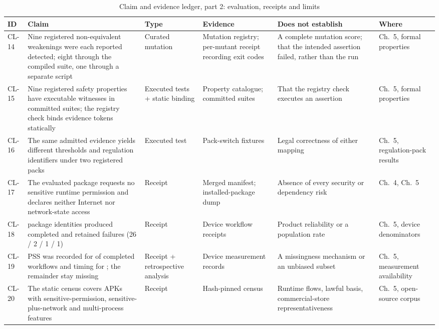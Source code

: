 \begin{table}[H]
\centering
\caption{Claim and evidence ledger, part 2: evaluation, receipts and limits}
\label{tab:claim-ledger-b}
\scriptsize
\setlength{\tabcolsep}{3pt}
\begin{tabular}{>{\raggedright\arraybackslash}p{}>{\raggedright\arraybackslash}p{}>{\raggedright\arraybackslash}p{}>{\raggedright\arraybackslash}p{}>{\raggedright\arraybackslash}p{}>{\raggedright\arraybackslash}p{}}
\toprule
ID & Claim & Type & Evidence & Does not establish & Where \\
\midrule
CL-14 & Nine registered non-equivalent weakenings were each reported detected; eight through the compiled suite, one through a separate script & Curated mutation & Mutation registry; per-mutant receipt recording exit codes & A complete mutation score; that the intended assertion failed, rather than the run & Ch.~5, formal properties \\
CL-15 & Nine registered safety properties have executable witnesses in committed suites; the registry check binds evidence tokens statically & Executed tests + static binding & Property catalogue; committed suites & That the registry check executes an assertion & Ch.~5, formal properties \\
CL-16 & The same admitted evidence yields different thresholds and regulation identifiers under two registered packs & Executed test & Pack-switch fixtures & Legal correctness of either mapping & Ch.~5, regulation-pack results \\
CL-17 & The evaluated package requests no sensitive runtime permission and declares neither Internet nor network-state access & Receipt & Merged manifest; installed-package dump & Absence of every security or dependency risk & Ch.~4, Ch.~5 \\
CL-18 & \DevicePackagesN{} package identities produced \CompletedWorkflowsN{} completed and \FailedDeviceWorkflowsN{} retained failures (26 / 2 / 1 / 1) & Receipt & Device workflow receipts & Product reliability or a population rate & Ch.~5, device denominators \\
CL-19 & PSS was recorded for \PssObservedN{} of \CompletedWorkflowsN{} completed workflows and timing for \TimingObservedN{}; the remainder stay missing & Receipt + retrospective analysis & Device measurement records & A missingness mechanism or an unbiased subset & Ch.~5, measurement availability \\
CL-20 & The static census covers \FDroidCensusN{} APKs with \FDroidSensitiveN{} sensitive-permission, \FDroidSensitiveNetworkN{} sensitive-plus-network and \FDroidMultiProcessN{} multi-process features & Receipt & Hash-pinned census & Runtime flows, lawful basis, commercial-store representativeness & Ch.~5, open-source corpus \\

\end{tabular}
\end{table}
